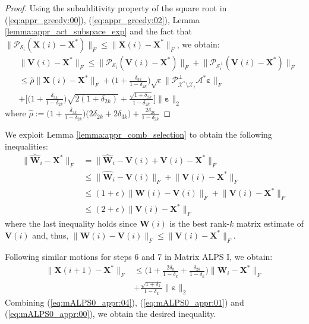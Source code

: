 \documentclass[twocolumn]{svjour3}
\newcommand{\vectornormbig}[1]{\big\|#1\big\|}
\newcommand{\sensing}{\boldsymbol{\mathcal{A}}}
\newcommand{\signal}{\boldsymbol{X}}
\newcommand{\bestsignal}{\boldsymbol{X}^\ast}
\newcommand{\noise}{\boldsymbol{\varepsilon}}
\newcommand{\rank}{k}
\begin{document}
\begin{proof}
Using the subadditivity property of the square root in (\ref{eq:appr_greedy:00}), (\ref{eq:appr_greedy:02}), Lemma \ref{lemma:appr_act_subspace_exp} and the fact that $ \vectornormbig{\mathcal{P}_{\mathcal{S}_i}(\signal(i) - \bestsignal)}_F \leq \vectornormbig{\signal(i) - \bestsignal}_F $, we obtain:
\begin{align}
&\vectornormbig{\boldsymbol{V}(i) - \bestsignal}_F \leq \vectornormbig{\mathcal{P}_{\mathcal{S}_i}(\boldsymbol{V}(i) - \bestsignal)}_F + \vectornormbig{\mathcal{P}_{\mathcal{S}_i^\bot}(\boldsymbol{V}(i) - \bestsignal)}_F \nonumber \\
&\leq \hat{\rho} \vectornormbig{\signal(i) - \bestsignal}_F + \big(1+ \frac{\delta_{3\rank}}{1-\delta_{2\rank}} \big)\sqrt{\epsilon}\vectornormbig{\mathcal{P}_{\mathcal{X}^\ast \setminus \mathcal{X}_i}^\bot \sensing^\ast \noise}_F \nonumber \\
&+ \Big[ \big(1+ \frac{\delta_{3\rank}}{1-\delta_{2\rank}}\big)\sqrt{2(1+\delta_{2\rank})} + \frac{\sqrt{1+\delta_{2\rank}}}{1-\delta_{2\rank}}\Big]\vectornormbig{\noise}_2 \label{eq:mALPS0_appr:00}
\end{align} where $\hat{\rho} := \Big( 1+ \frac{\delta_{3\rank}}{1-\delta_{2\rank}}\Big)\Big(2\delta_{2\rank} + 2\delta_{3\rank}\Big) + \frac{2\delta_{2\rank}}{1-\delta_{2\rank}}$
\end{proof}

We exploit Lemma \ref{lemma:appr_comb_selection} to obtain the following inequalities:
\begin{align}
\vectornormbig{\widehat{\boldsymbol{W}}_i - \bestsignal}_F &= \vectornormbig{\widehat{\boldsymbol{W}}_i - \boldsymbol{V}(i) + \boldsymbol{V}(i) - \bestsignal}_F \nonumber \\ &\leq \vectornormbig{\widehat{\boldsymbol{W}}_i - \boldsymbol{V}(i)}_F + \vectornormbig{\boldsymbol{V}(i) - \bestsignal}_F \nonumber \\ &\leq (1+\epsilon)\vectornormbig{\boldsymbol{W}(i) - \boldsymbol{V}(i)}_F + \vectornormbig{\boldsymbol{V}(i) - \bestsignal}_F \nonumber \\ &\leq (2 + \epsilon)\vectornormbig{\boldsymbol{V}(i) - \bestsignal}_F \label{eq:mALPS0_appr:01}
\end{align} where the last inequality holds since $ \boldsymbol{W}(i) $ is the best rank-$ \rank $ matrix estimate of $ \boldsymbol{V}(i) $ and, thus, $ \vectornormbig{\boldsymbol{W}(i) - \boldsymbol{V}(i)}_F \leq \vectornormbig{\boldsymbol{V}(i) - \bestsignal}_F $.

Following similar motions for steps 6 and 7 in Matrix ALPS I, we obtain:
\begin{align}
\vectornormbig{\signal(i+1) - \bestsignal}_F &\leq \big(1 + \frac{2\delta_{\rank}}{1-\delta_{\rank}} + \frac{\delta_{2\rank}}{1-\delta_{\rank}} \big)\vectornormbig{\widehat{\boldsymbol{W}}_i - \bestsignal}_F \nonumber \\ &+ \frac{\sqrt{1+\delta_{\rank}}}{1-\delta_{\rank}}\vectornormbig{\noise}_2 \label{eq:mALPS0_appr:04}
\end{align} Combining (\ref{eq:mALPS0_appr:04}), (\ref{eq:mALPS0_appr:01}) and (\ref{eq:mALPS0_appr:00}), we obtain the desired inequality.



\end{document}
